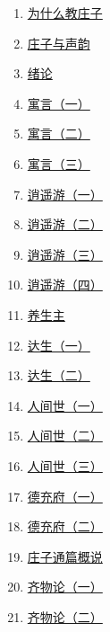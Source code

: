 \documentclass[11pt]{article}
\begin{document}
\begin{multicols}{3}
	\begin{enumerate}
		\item \href{https://mp.weixin.qq.com/s/RVz__rzyYfCfndzA7WhCRQ}{为什么教庄子}	%
		\item \href{https://mp.weixin.qq.com/s/hLRrTNEGJPubIFVDEP3bsw}{庄子与声韵}	%
		\item \href{https://mp.weixin.qq.com/s/IopmldGzEvHHaBrDsI4iJQ}{绪论}	%
		\item \href{https://mp.weixin.qq.com/s/iI10U6LPuhN3mWbDNjpXVg}{寓言（一）}	%
		\item \href{https://mp.weixin.qq.com/s/0bg7qoVLjRFydrvM9zUabw?poc_token=HFUxj2ijES8UVWW8agBDEDaDEhDewbUerccv4v2d}{寓言（二）}	%
		\item \href{https://mp.weixin.qq.com/s/5oftMqsPPguMmG1iAiZb3Q}{寓言（三）}	%
		\item \href{https://mp.weixin.qq.com/s/fWmdOTBTSKMK447bhBNm3A}{逍遥游（一）}	%
		\item \href{https://mp.weixin.qq.com/s/TlTBNy2Rn5TcjOnhnF0hjg}{逍遥游（二）}	%
		\item \href{https://mp.weixin.qq.com/s/99hw1EBAfLWyrMRiRrukHw}{逍遥游（三）}	%
		\item \href{https://mp.weixin.qq.com/s/ko0OCQnzoYjHoSzYcdjiHg}{逍遥游（四）}	%
		\item \href{https://mp.weixin.qq.com/s/0cgd-TX8OehI-SOBOpg7wQ}{养生主}	%
		\item \href{https://mp.weixin.qq.com/s/TQ-kFdrpo5S_WPuus4W5bA}{达生（一）}	%
		\item \href{https://mp.weixin.qq.com/s/vGbD6XP1zPF2PdWv0duCFg}{达生（二）}	%
		\item \href{https://mp.weixin.qq.com/s/lF7NCKpota3wLvTTkAoS7Q}{人间世（一）}	%
		\item \href{https://mp.weixin.qq.com/s/1uKBKYdkBj20JqRzaiomQQ}{人间世（二）}	%
		\item \href{https://mp.weixin.qq.com/s/0WptAqacAv_yFHtdoWr79w}{人间世（三）}	%
		\item \href{https://mp.weixin.qq.com/s/UUwOzZEc1Km-TfLmdaTcRA}{德充府（一）}	%
		\item \href{https://mp.weixin.qq.com/s/4njrz0JyY4wWcI1yflRXeg}{德充府（二）}	%
		\item \href{https://mp.weixin.qq.com/s/tGankUO5PVRrnfe9ZLNxuw}{庄子通篇概说}	%
		\item \href{https://mp.weixin.qq.com/s/nSZSrweS0jn_p0eVe_0w5A}{齐物论（一）}	%
		\item \href{https://mp.weixin.qq.com/s/kG9J15-cL7JVdE8LqSwhYw}{齐物论（二）}	%

\end{enumerate}
\end{multicols}
\end{document}
